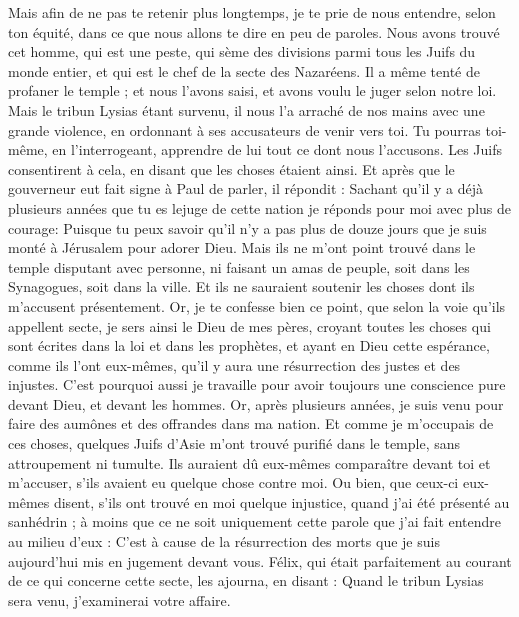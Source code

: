 \begin{multicols}{2}
{{{Mais afin de ne pas te retenir plus longtemps, je te prie de nous entendre, selon ton équité, dans ce que nous allons te dire en peu de paroles.
Nous avons trouvé cet homme, qui est une peste, qui sème des divisions parmi tous les Juifs du monde entier, et qui est le chef de la secte des Nazaréens.
Il a même tenté de profaner le temple ; et nous l'avons saisi, et avons voulu le juger selon notre loi.
Mais le tribun Lysias étant survenu, il nous l'a arraché de nos mains avec une grande violence,
en ordonnant à ses accusateurs de venir vers toi. Tu pourras toi-même, en l'interrogeant, apprendre de lui tout ce dont nous l'accusons.
Les Juifs consentirent à cela, en disant que les choses étaient ainsi.
Et après que le gouverneur eut fait signe à Paul de parler, il répondit : Sachant qu'il y a déjà plusieurs années que tu es lejuge de cette nation je réponds pour moi avec plus de courage:
Puisque tu peux savoir qu'il n'y a pas plus de douze jours que je suis monté à Jérusalem pour adorer Dieu.
Mais ils ne m'ont point trouvé dans le temple disputant avec personne, ni faisant un amas de peuple, soit dans les Synagogues, soit dans la ville. 
Et ils ne sauraient soutenir les choses dont ils m'accusent présentement.
Or, je te confesse bien ce point, que selon la voie qu'ils appellent secte, je sers ainsi le Dieu de mes pères, croyant toutes les choses qui sont écrites dans la loi et dans les prophètes,
et ayant en Dieu cette espérance, comme ils l'ont eux-mêmes, qu'il y aura une résurrection des justes et des injustes.
C'est pourquoi aussi je travaille pour avoir toujours une conscience pure devant Dieu, et devant les hommes.
Or, après plusieurs années, je suis venu pour faire des aumônes et des offrandes dans ma nation.
Et comme je m'occupais de ces choses, quelques Juifs d'Asie m'ont trouvé purifié dans le temple, sans attroupement ni tumulte.
Ils auraient dû eux-mêmes comparaître devant toi et m'accuser, s'ils avaient eu quelque chose contre moi.
Ou bien, que ceux-ci eux-mêmes disent, s'ils ont trouvé en moi quelque injustice, quand j'ai été présenté au sanhédrin ;
à moins que ce ne soit uniquement cette parole que j'ai fait entendre au milieu d'eux : C'est à cause de la résurrection des morts que je suis aujourd'hui mis en jugement devant vous.
Félix, qui était parfaitement au courant de ce qui concerne cette secte, les ajourna, en disant : Quand le tribun Lysias sera venu, j'examinerai votre affaire.
}}}
\end{multicols}
